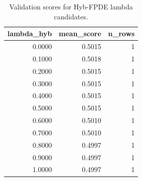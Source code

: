 \begin{table}[t]
\caption{Validation scores for Hyb-FPDE lambda candidates.}
\label{tab:lambda_distribution_computed}
\centering
\begin{tabular}{rrr}
\toprule
lambda\_hyb & mean\_score & n\_rows \\
\midrule
0.0000 & 0.5015 & 1 \\
0.1000 & 0.5018 & 1 \\
0.2000 & 0.5015 & 1 \\
0.3000 & 0.5015 & 1 \\
0.4000 & 0.5015 & 1 \\
0.5000 & 0.5015 & 1 \\
0.6000 & 0.5010 & 1 \\
0.7000 & 0.5010 & 1 \\
0.8000 & 0.4997 & 1 \\
0.9000 & 0.4997 & 1 \\
1.0000 & 0.4997 & 1 \\
\bottomrule
\end{tabular}

\end{table}
